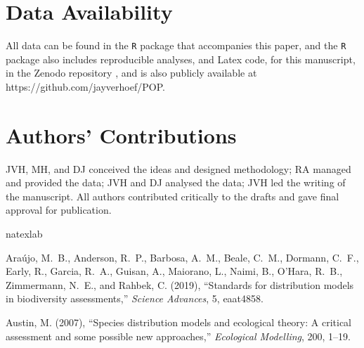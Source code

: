 \documentclass[11pt, titlepage]{article}
\begin{document}
\begin{spacing}{1.9}
\begin{flushleft}
\section*{Data Availability}

All data can be found in the \texttt{R} package that accompanies this paper, and the \texttt{R} package also includes reproducible analyses, and Latex code, for this manuscript, in the Zenodo repository \citep{ver_hoef_data_2021}, and is also publicly available at https://github.com/jayverhoef/POP.

\section*{Authors' Contributions}

JVH, MH, and DJ conceived the ideas and designed methodology; RA managed and provided the data; JVH and DJ analysed the data; JVH led the writing of the manuscript. All authors contributed critically to the drafts and gave final approval for publication.


%
%
%
%
%

\begin{thebibliography}{59}
\newcommand{\enquote}[1]{``#1''}
\expandafter\ifx\csname natexlab\endcsname\relax\def\natexlab#1{#1}\fi

Araújo, M.~B., Anderson, R.~P., Barbosa, A.~M., Beale, C.~M., Dormann, C.~F.,
  Early, R., Garcia, R.~A., Guisan, A., Maiorano, L., Naimi, B., O'Hara, R.~B.,
  Zimmermann, N.~E., and Rahbek, C. (2019), \enquote{Standards for distribution
  models in biodiversity assessments,} \textit{Science Advances}, 5, eaat4858.

Austin, M. (2007), \enquote{Species distribution models and ecological theory:
  {A} critical assessment and some possible new approaches,} \textit{Ecological
  Modelling}, 200, 1--19.


\end{thebibliography}
\end{flushleft}
\end{spacing}
\end{document}
